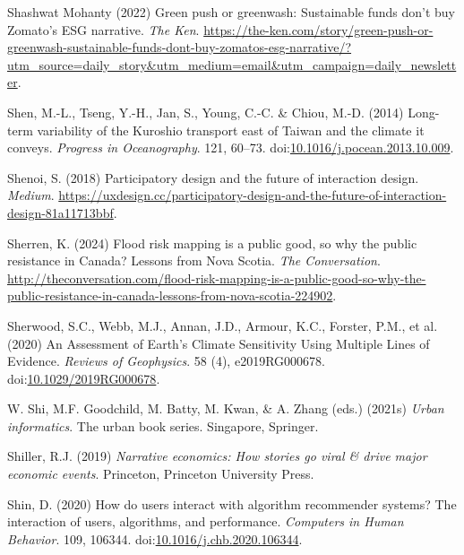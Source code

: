 \documentclass[
  letterpaper,
  DIV=11,
  numbers=noendperiod]{scrartcl}
\newlength{\cslhangindent}
\newenvironment{CSLReferences}[2] %
 {\begin{list}{}{%
  \setlength{\itemindent}{0pt}
  \setlength{\leftmargin}{0pt}
  \setlength{\parsep}{0pt}
  \ifodd #1
   \setlength{\leftmargin}{\cslhangindent}
   \setlength{\itemindent}{-1\cslhangindent}
  \fi
  \setlength{\itemsep}{#2\baselineskip}}}
 {\end{list}}
\begin{document}
\begin{CSLReferences}{0}{1}
Shashwat Mohanty (2022) Green push or greenwash: Sustainable funds don't
buy {Zomato}'s {ESG} narrative. \emph{The Ken}.
\url{https://the-ken.com/story/green-push-or-greenwash-sustainable-funds-dont-buy-zomatos-esg-narrative/?utm_source=daily_story&utm_medium=email&utm_campaign=daily_newsletter}.

Shen, M.-L., Tseng, Y.-H., Jan, S., Young, C.-C. \& Chiou, M.-D. (2014)
Long-term variability of the {Kuroshio} transport east of {Taiwan} and
the climate it conveys. \emph{Progress in Oceanography}. 121, 60--73.
doi:\href{https://doi.org/10.1016/j.pocean.2013.10.009}{10.1016/j.pocean.2013.10.009}.

Shenoi, S. (2018) Participatory design and the future of interaction
design. \emph{Medium}.
\url{https://uxdesign.cc/participatory-design-and-the-future-of-interaction-design-81a11713bbf}.

Sherren, K. (2024) Flood risk mapping is a public good, so why the
public resistance in {Canada}? {Lessons} from {Nova Scotia}. \emph{The
Conversation}.
\url{http://theconversation.com/flood-risk-mapping-is-a-public-good-so-why-the-public-resistance-in-canada-lessons-from-nova-scotia-224902}.

Sherwood, S.C., Webb, M.J., Annan, J.D., Armour, K.C., Forster, P.M., et
al. (2020) An {Assessment} of {Earth}'s {Climate Sensitivity Using
Multiple Lines} of {Evidence}. \emph{Reviews of Geophysics}. 58 (4),
e2019RG000678.
doi:\href{https://doi.org/10.1029/2019RG000678}{10.1029/2019RG000678}.

W. Shi, M.F. Goodchild, M. Batty, M. Kwan, \& A. Zhang (eds.) (2021s)
\emph{Urban informatics}. The urban book series. Singapore, Springer.

Shiller, R.J. (2019) \emph{Narrative economics: How stories go viral \&
drive major economic events}. Princeton, Princeton University Press.

Shin, D. (2020) How do users interact with algorithm recommender
systems? {The} interaction of users, algorithms, and performance.
\emph{Computers in Human Behavior}. 109, 106344.
doi:\href{https://doi.org/10.1016/j.chb.2020.106344}{10.1016/j.chb.2020.106344}.


\end{CSLReferences}
\end{document}
